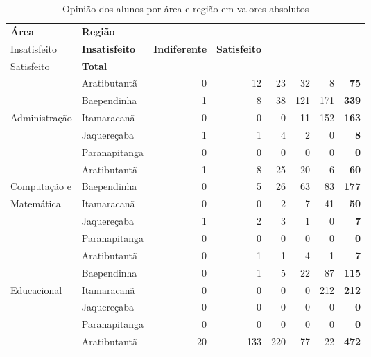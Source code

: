 \begin{table}[!h]
\scriptsize
\centering
\caption{Opinião dos alunos por área e região em valores absolutos}
\vspace{0.5em}
\label{tabela:q15a}
\begin{tabular}{llrrrrrr}
\toprule
\textbf{Área} & \textbf{Região} &  \textbf{\specialcell{c}{Muito\\Insatisfeito}} &  \textbf{Insatisfeito} &  \textbf{ Indiferente} &  \textbf{ Satisfeito} & \textbf{\specialcell{c}{Muito\\Satisfeito}} & \textbf{Total} \\
   \midrule
					& Aratibutantã  &   0 &  12 &  23 &  32 &   8 & \textbf{75}\\ 
                    & Baependinha   &   1 &   8 &  38 & 121 & 171 & \textbf{339}\\ 
   Administração    & Itamaracanã   &   0 &   0 &   0 &  11 & 152 & \textbf{163}\\ 
                    & Jaquereçaba   &   1 &   1 &   4 &   2 &   0 & \textbf{8}\\ 
                    & Paranapitanga &   0 &   0 &   0 &   0 &   0 & \textbf{0}\\ 
\midrule
					& Aratibutantã  &   1 &   8 &  25 &  20 &   6 & \textbf{60}\\ 
	Computação e    & Baependinha   &   0 &   5 &  26 &  63 &  83 & \textbf{177}\\ 
	Matemática  	& Itamaracanã   &   0 &   0 &   2 &   7 &  41 & \textbf{50}\\ 
					& Jaquereçaba   &   1 &   2 &   3 &   1 &   0 & \textbf{7}\\ 
                    & Paranapitanga	&   0 &   0 &   0 &   0 &   0 & \textbf{0}\\ 
\midrule
					& Aratibutantã  &   0 &   1 &   1 &   4 &   1 & \textbf{7}\\ 
                    & Baependinha   &   0 &   1 &   5 &  22 &  87 & \textbf{115}\\ 
  Educacional       & Itamaracanã   &   0 &   0 &   0 &   0 & 212 & \textbf{212}\\ 
                    & Jaquereçaba   &   0 &   0 &   0 &   0 &   0 & \textbf{0}\\ 
                    & Paranapitanga &   0 &   0 &   0 &   0 &   0 & \textbf{0}\\ 
\midrule			
					& Aratibutantã  &  20 & 133 & 220 &  77 &  22 & \textbf{472}\\ 

\end{tabular}
\end{table}
